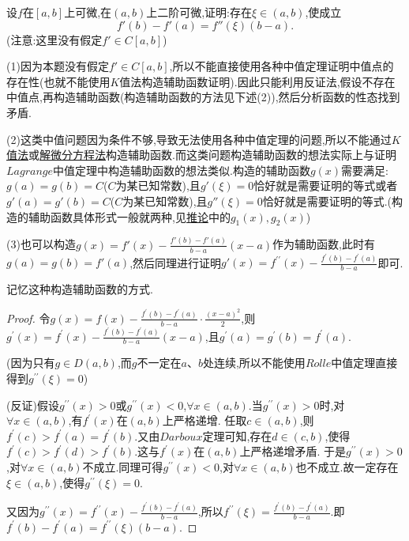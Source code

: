 \documentclass[lang=cn,newtx,10pt,scheme=chinese]{elegantbook}
\begin{document}
\begin{proposition}\label{pro:Lagrange中值定理的推广(二阶导数)}
    设\(f\)在\([a,b]\)上可微,在\((a,b)\)上二阶可微,证明:存在\(\xi\in(a,b)\),使成立
    \[
    f'(b) - f'(a) = f''(\xi)(b - a).
    \]
    (注意:这里没有假定\(f'\in C[a,b]\))
\end{proposition}
\begin{note}
    (1)因为本题没有假定\(f'\in C[a,b]\),所以不能直接使用各种中值定理证明中值点的存在性(也就不能使用$K$值法构造辅助函数证明).因此只能利用反证法,假设不存在中值点,再构造辅助函数(构造辅助函数的方法见下述(2)),然后分析函数的性态找到矛盾.

    (2)这类中值问题因为条件不够,导致无法使用各种中值定理的问题,所以不能通过\hyperlink{a}{$K$值法}或\hyperlink{a}{解微分方程法}构造辅助函数.而这类问题构造辅助函数的想法实际上与证明$Lagrange$中值定理中构造辅助函数的想法类似.构造的辅助函数$g(x)$需要满足:$g(a)=g(b)=C$($C$为某已知常数),且$g'(\xi)=0$恰好就是需要证明的等式或者$g'(a)=g'(b)=C$($C$为某已知常数),且$g''(\xi)=0$恰好就是需要证明的等式.(构造的辅助函数具体形式一般就两种,见\hyperref[cor:Lagrange中值定理的推广(k+1阶导数)]{推论}中的$g_1(x),g_2(x)$)

    (3)也可以构造$g\left( x \right) =f'\left( x \right) -\frac{f'\left( b \right) -f'\left( a \right)}{b-a}\left( x-a \right)$作为辅助函数,此时有$g(a)=g(b)=f'(a)$,然后同理进行证明$g'(x)=f^{\prime\prime}(x) - \frac{f^{\prime}(b) - f^{\prime}(a)}{b - a}$即可.
\end{note}
\begin{remark}
    记忆这种构造辅助函数的方式.
\end{remark}
\begin{proof}\label{proof:Lagrange中值定理的推广(二阶导数)-证明}
    令\(g(x) = f(x) - \frac{f^{\prime}(b) - f^{\prime}(a)}{b - a} \cdot \frac{(x - a)^2}{2}\),则\(g^{\prime}(x) = f^{\prime}(x) - \frac{f^{\prime}(b) - f^{\prime}(a)}{b - a}(x - a)\),且\(g^{\prime}(a) = g^{\prime}(b) = f^{\prime}(a)\).

(因为只有\(g\in D(a,b)\),而\(g\)不一定在\(a\)、\(b\)处连续,所以不能使用\(Rolle\)中值定理直接得到\(g^{\prime\prime}(\xi) = 0\))

(反证)假设\(g^{\prime\prime}(x) > 0\)或\(g^{\prime\prime}(x) < 0\),\(\forall x\in (a,b)\).当\(g^{\prime\prime}(x) > 0\)时,对\(\forall x\in (a,b)\),有\(f^{\prime}(x)\)在\((a,b)\)上严格递增.
任取\(c\in (a,b)\),则\(f^{\prime}(c) > f^{\prime}(a) = f^{\prime}(b)\).又由\(Darboux\)定理可知,存在\(d\in (c,b)\),使得\(f^{\prime}(c) > f^{\prime}(d) > f^{\prime}(b)\).这与\(f^{\prime}(x)\)在\((a,b)\)上严格递增矛盾.
于是\(g^{\prime\prime}(x) > 0\),对\(\forall x\in (a,b)\)不成立.同理可得\(g^{\prime\prime}(x) < 0\),对\(\forall x\in (a,b)\)也不成立.故一定存在\(\xi \in (a,b)\),使得\(g^{\prime\prime}(\xi) = 0\).

又因为\(g^{\prime\prime}(x) = f^{\prime\prime}(x) - \frac{f^{\prime}(b) - f^{\prime}(a)}{b - a}\),所以\(f^{\prime\prime}(\xi) = \frac{f^{\prime}(b) - f^{\prime}(a)}{b - a}\).即\(f^{\prime}(b) - f^{\prime}(a) = f^{\prime\prime}(\xi)(b - a)\).
\end{proof}
\end{document}
